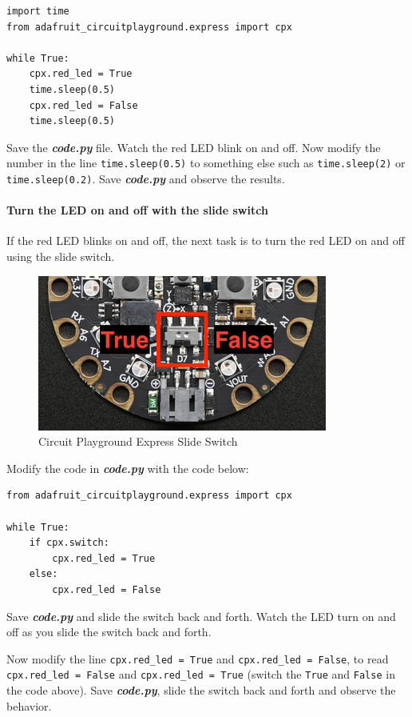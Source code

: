 \documentclass[11pt]{article}
\makeatletter
\def\maxwidth{\ifdim\Gin@nat@width>\linewidth\linewidth
    \else\Gin@nat@width\fi}
\let\Oldincludegraphics\includegraphics
\renewcommand{\includegraphics}[1]{\Oldincludegraphics[width=.8\maxwidth]{#1}}
\makeatother
\begin{document}
\begin{verbatim}
import time
from adafruit_circuitplayground.express import cpx
     
while True:
    cpx.red_led = True
    time.sleep(0.5)
    cpx.red_led = False
    time.sleep(0.5)
\end{verbatim}

Save the \textbf{\emph{code.py}} file. Watch the red LED blink on and
off. Now modify the number in the line \texttt{time.sleep(0.5)} to
something else such as \texttt{time.sleep(2)} or
\texttt{time.sleep(0.2)}. Save \textbf{\emph{code.py}} and observe the
results.

\hypertarget{turn-the-led-on-and-off-with-the-slide-switch}{%
\paragraph{Turn the LED on and off with the slide
switch}\label{turn-the-led-on-and-off-with-the-slide-switch}}

If the red LED blinks on and off, the next task is to turn the red LED
on and off using the slide switch.

\begin{figure}
\centering
\includegraphics{images/circuitpython_cpx_slide_switch.jpg}
\caption{Circuit Playground Express Slide Switch}
\end{figure}

Modify the code in \textbf{\emph{code.py}} with the code below:

\begin{verbatim}
from adafruit_circuitplayground.express import cpx

while True:
    if cpx.switch:
        cpx.red_led = True
    else:
        cpx.red_led = False
\end{verbatim}

Save \textbf{\emph{code.py}} and slide the switch back and forth. Watch
the LED turn on and off as you slide the switch back and forth.

Now modify the line \texttt{cpx.red\_led\ =\ True} and
\texttt{cpx.red\_led\ =\ False}, to read \texttt{cpx.red\_led\ =\ False}
and \texttt{cpx.red\_led\ =\ True} (switch the \texttt{True} and
\texttt{False} in the code above). Save \textbf{\emph{code.py}}, slide
the switch back and forth and observe the behavior.
\end{document}

